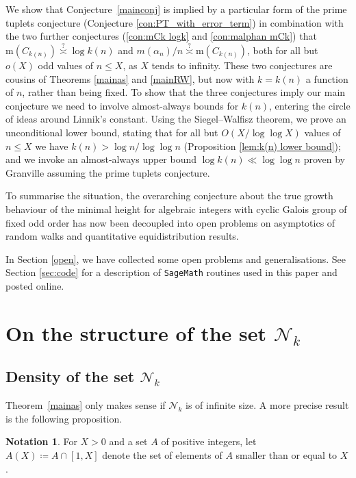 \documentclass[12pt,reqno]{amsart}
\theoremstyle{definition}
\theoremstyle{plain}
\theoremstyle{definition}
\newtheorem{notation}[theorem]{Notation}
\newcommand\m{\mathrm{m}}
\newcommand\NN{{\mathcal N}}
\renewcommand{\leq}{\leqslant}
\begin{document}
We show that Conjecture~\ref{mainconj} is implied by a particular form of the prime tuplets conjecture (Conjecture \ref{con:PT_with_error_term}) in combination with the two further conjectures (\ref{con:mCk logk} and \ref{con:malphan mCk}) that $\m(C_{k(n)})  \overset{?}{\asymp}  \log k(n)$ and $m(\alpha_n)/n  \overset{?}{\asymp}  \m(C_{k(n)})$, both for all but $o(X)$ odd values of $n \leq X$, as $X$ tends to infinity.  These two conjectures are cousins of Theorems \ref{mainas} and \ref{mainRW}, but now with $k=k(n)$ a function of $n$, rather than being fixed. To show that the three conjectures imply our main conjecture we need to involve almost-always bounds for $k(n)$, entering the circle of ideas around Linnik's constant. Using the Siegel--Walfisz theorem, we prove an unconditional lower bound, stating that for all but $O(X/\log{\log{X}})$ values of $n \leq X$ we have $k(n) > \log{n}/\log{\log{n}}$ (Proposition \ref{lem:k(n) lower bound}); and we invoke an almost-always upper bound $\log k(n) \ll \log \log n$ proven by Granville assuming the prime tuplets conjecture.  

To summarise the situation, the overarching conjecture about the true growth behaviour of the minimal height for algebraic integers with cyclic Galois group of fixed odd order has now been decoupled into open problems on asymptotics of random walks and quantitative equidistribution results. 

\medskip

In Section \ref{open}, we have collected some open problems and generalisations. See Section \ref{sec:code} for a description of \texttt{SageMath}  \cite{SageMath} routines used in this paper and posted online. 
 
\section{On the structure of the set $\mathcal N_k$} 
  
\subsection{Density of the set $\NN_k$} \label{asNNk}
 
Theorem~\ref{mainas} only makes sense if $\NN_k$ is of infinite size. A more precise result is the following proposition. 

\begin{notation} For $X>0$ and a set $A$ of positive integers, let $A(X) \coloneqq  A \cap [1,X]$ denote the set of elements of $A$ smaller than or equal to $X$. 
 \end{notation} 
 
\end{document}

